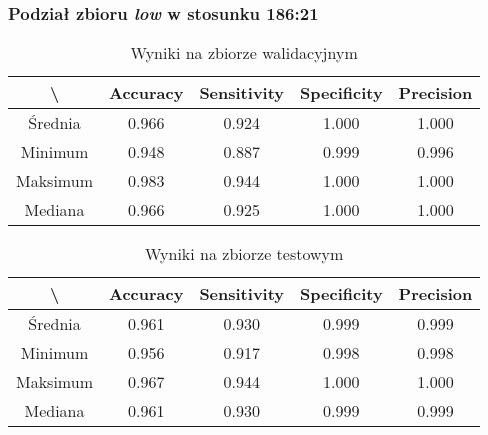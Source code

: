 \newpage
\subsubsection{Podział zbioru \textit{low} w stosunku 186:21}

\begin{table}[!h]
	\centering
	\caption{Wyniki na zbiorze walidacyjnym}
	\vspace{6pt}
	{\footnotesize
		\begin{tabular}{|c|c|c|c|c|}
      \hline \textbackslash & Accuracy & Sensitivity & Specificity & Precision \\
      \hline Średnia & 0.966 & 0.924 & 1.000 & 1.000 \\
      \hline Minimum & 0.948 & 0.887 & 0.999 & 0.996 \\
      \hline Maksimum & 0.983 & 0.944 & 1.000 & 1.000 \\
      \hline Mediana & 0.966 & 0.925 & 1.000 & 1.000 \\
      \hline
		\end{tabular}
	}
	\vspace{0pt}
\end{table}

\begin{table}[!h]
	\centering
	\caption{Wyniki na zbiorze testowym}
	\vspace{6pt}
	{\footnotesize
		\begin{tabular}{|c|c|c|c|c|}
      \hline \textbackslash & Accuracy & Sensitivity & Specificity & Precision \\
      \hline Średnia & 0.961 & 0.930 & 0.999 & 0.999 \\
      \hline Minimum & 0.956 & 0.917 & 0.998 & 0.998 \\
      \hline Maksimum & 0.967 & 0.944 & 1.000 & 1.000 \\
      \hline Mediana & 0.961 & 0.930 & 0.999 & 0.999 \\
      \hline
		\end{tabular}
	}
	\vspace{0pt}
\end{table}
